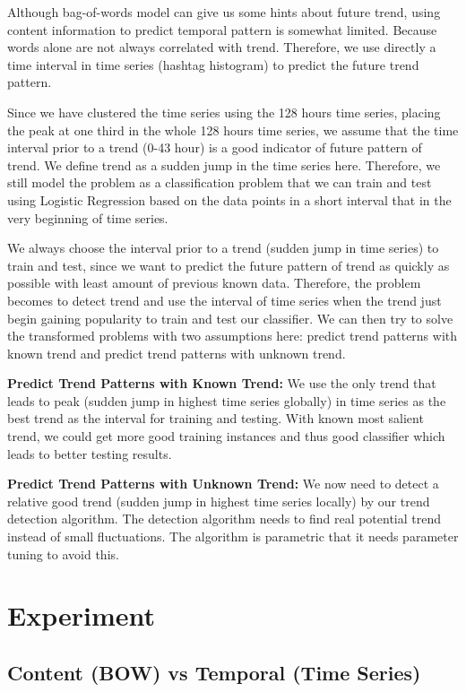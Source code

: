 \documentclass{article}
\begin{document}
Although bag-of-words model can give us some hints about future trend, using content information to predict temporal pattern is somewhat limited. Because words alone are not always correlated with trend. Therefore, we use directly a time interval in time series (hashtag histogram) to predict the future trend pattern. 

Since we have clustered the time series using the 128 hours time series, placing the peak at one third in the whole 128 hours time series, we assume that the time interval prior to a trend (0-43 hour) is a good indicator of future pattern of trend. We define trend as a sudden jump in the time series here. Therefore, we still model the problem as a classification problem that we can train and test using Logistic Regression based on the data points in a short interval that in the very beginning of time series. 

We always choose the interval prior to a trend (sudden jump in time series) to train and test, since we want to predict the future pattern of trend as quickly as possible with least amount of previous known data. Therefore, the problem becomes to detect trend and use the interval of time series when the trend just begin gaining popularity to train and test our classifier. We can then try to solve the transformed problems with two assumptions here: predict trend patterns with known trend and predict trend patterns with unknown trend. 

{\bf Predict Trend Patterns with Known Trend:} We use the only trend that leads to peak (sudden jump in highest time series globally) in time series as the best trend as the interval for training and testing. With known most salient trend, we could get more good training instances and thus good classifier which leads to better testing results.

{\bf Predict Trend Patterns with Unknown Trend:} We now need to detect a relative good trend (sudden jump in highest time series locally) by our trend detection algorithm. The detection algorithm needs to find real potential trend instead of small fluctuations. The algorithm is parametric that it needs parameter tuning to avoid this. 






\section{Experiment} 

\subsection{Content (BOW) vs Temporal (Time Series)}
\end{document}
